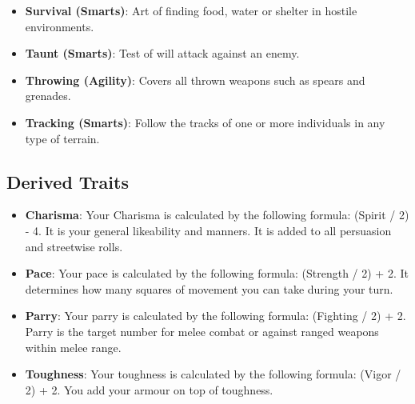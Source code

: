 \documentclass[10pt,twoside]{article}
\begin{document}
\begin{multicols}{2}
\begin{itemize}
            \item \textbf{Survival (Smarts)}: Art of finding food, water or shelter in hostile environments.

            \item \textbf{Taunt (Smarts)}: Test of will attack against an enemy.

            \item \textbf{Throwing (Agility)}: Covers all thrown weapons such as spears and grenades.

            \item \textbf{Tracking (Smarts)}: Follow the tracks of one or more individuals in any type of terrain.

        \end{itemize}


        \subsection{Derived Traits}

        \begin{itemize}

            \item \textbf{Charisma}: Your Charisma is calculated by the following formula: (Spirit / 2) - 4. It is your general likeability and manners. It is added to all persuasion and streetwise rolls.

            \item \textbf{Pace}: Your pace is calculated by the following formula: (Strength / 2) + 2. It determines how many squares of movement you can take during your turn.

            \item \textbf{Parry}: Your parry is calculated by the following formula: (Fighting / 2) + 2. Parry is the target number for melee combat or against ranged weapons within melee range.

            \item \textbf{Toughness}: Your toughness is calculated by the following formula: (Vigor / 2) + 2. You add your armour on top of toughness.

        \end{itemize}

    \end{multicols}

    \newpage
\end{document}
